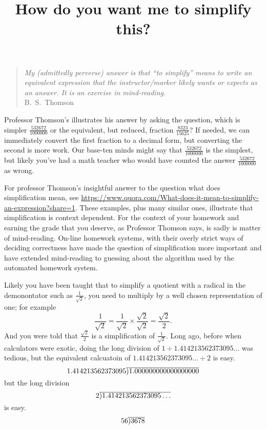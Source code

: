\documentclass[12pt,fleqn]{article}
\title{How do you want me to simplify this?}
\newcommand\showdiv[1]{\overline{\smash{)}#1}}
\begin{document}
\maketitle
\begin{quote}
\emph{My (admittedly perverse) answer is that ``to simplify''  means to write an equivalent expression that the instructor/marker likely wants or expects as an answer. It is an exercise in mind-reading.}  \\  \phantom{xxxxx} \hfill   {\mbox{\sc B.\ S.\ Thomson}}
\end{quote}
\normalsize 

Professor Thomson's  illustrates his answer by asking the question, which is simpler \( \frac{532672}{1000000} \) or 
the equivalent, but reduced,  fraction \(\frac {8323}{15625} \)?  If needed, we can immediately convert the first fraction to a
decimal form, but converting the second is more work.  Our base-ten minds might say that \(\frac{532672}{1000000} \) is the simplest, but likely you've had a math teacher who would have counted the answer \( \frac{532672}{1000000} \) as wrong.  

For professor Thomson's insightful answer to the question what does simplification mean, see \url{https://www.quora.com/What-does-it-mean-to-simplify-an-expression?share=1}. These examples, plus many similar ones, illustrate that simplification is context dependent. For the context of your homework and earning the grade that you deserve, as Professor Thomson says,  is sadly is  matter of mind-reading.  On-line homework systems, with their overly strict ways of deciding correctness have made the question of simplification more important and have extended mind-reading to guessing about the algorithm used by the automated homework system.

Likely you have been taught that to simplify a quotient with a radical in the demonontator such as $\frac{1}{\sqrt{2}}$, you need to multiply by a well chosen representation of one; for example
\[
   \frac{1}{\sqrt{2}} = \frac{1}{\sqrt{2}} \times \frac{\sqrt{2}}{\sqrt{2}}  = \frac{\sqrt{2}}{2}.
\]
And you were told that \(\frac{\sqrt{2}}{2}\) is a simplification of \(\frac{1}{\sqrt{2}} \). 
Long ago, before when calculators were exotic, doing the long division of \(1 \div 1.414213562373095\dots\) was tedious, but
the equivalent calcuatoin of \(1.414213562373095 \dots \div 2\) is easy.
\[
   1.414213562373095 \showdiv{1.000000000000000000}
\]
but the long division
\[
     2 \showdiv{1.414213562373095 \dots} 
\]
is easy.
\[
56 \showdiv{3678}
\]
\end{document}
